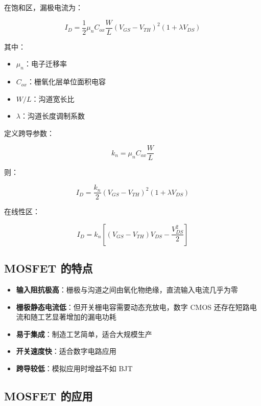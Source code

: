 在饱和区，漏极电流为：

\begin{equation}
I_D = \frac{1}{2}\mu_n C_{ox} \frac{W}{L} (V_{GS} - V_{TH})^2 (1 + \lambda V_{DS}) \label{eq:mosfet-saturation}
\end{equation}

其中：
\begin{itemize}
  \item $\mu_n$：电子迁移率
  \item $C_{ox}$：栅氧化层单位面积电容
  \item $W/L$：沟道宽长比
  \item $\lambda$：沟道长度调制系数
\end{itemize}

定义跨导参数：

\begin{equation}
k_n = \mu_n C_{ox} \frac{W}{L} \label{eq:mosfet-kn}
\end{equation}

则：

\begin{equation}
I_D = \frac{k_n}{2} (V_{GS} - V_{TH})^2 (1 + \lambda V_{DS}) \label{eq:mosfet-saturation-simple}
\end{equation}

在线性区：

\begin{equation}
I_D = k_n \left[(V_{GS} - V_{TH})V_{DS} - \frac{V_{DS}^2}{2}\right] \label{eq:mosfet-linear}
\end{equation}

\subsection{MOSFET 的特点}

\begin{itemize}
  \item \textbf{输入阻抗极高}：栅极与沟道之间由氧化物绝缘，直流输入电流几乎为零
  \item \textbf{栅极静态电流低}：但开关栅电容需要动态充放电，数字 CMOS 还存在短路电流和随工艺显著增加的漏电功耗
  \item \textbf{易于集成}：制造工艺简单，适合大规模生产
  \item \textbf{开关速度快}：适合数字电路应用
  \item \textbf{跨导较低}：模拟应用时增益不如 BJT
\end{itemize}

\subsection{MOSFET 的应用}

